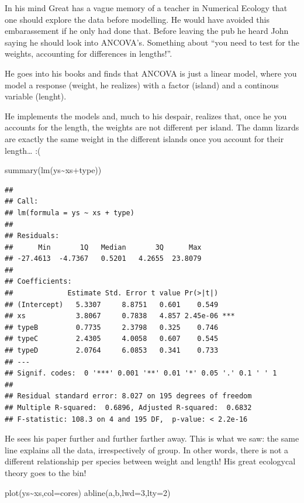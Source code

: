 \documentclass[
]{book}
\newenvironment{Shaded}{\begin{snugshade}}{\end{snugshade}}
\newcommand{\AttributeTok}[1]{\textcolor[rgb]{0.77,0.63,0.00}{#1}}
\newcommand{\DecValTok}[1]{\textcolor[rgb]{0.00,0.00,0.81}{#1}}
\newcommand{\FunctionTok}[1]{\textcolor[rgb]{0.00,0.00,0.00}{#1}}
\newcommand{\NormalTok}[1]{#1}
\newcommand{\SpecialCharTok}[1]{\textcolor[rgb]{0.00,0.00,0.00}{#1}}
\begin{document}
In his mind Great has a vague memory of a teacher in Numerical Ecology that one should explore the data before modelling. He would have avoided this embarassement if he only had done that. Before leaving the pub he heard John saying he should look into ANCOVA's. Something about ``you need to test for the weights, accounting for differences in lengths!''.

He goes into his books and finds that ANCOVA is just a linear model, where you model a response (weight, he realizes) with a factor (island) and a continous variable (lenght).

He implements the models and, much to his despair, realizes that, once he you accounts for the length, the weights are not different per island. The damn lizards are exactly the same weight in the different islands once you account for their length\ldots{} :(

\begin{Shaded}
\begin{Highlighting}[]
\FunctionTok{summary}\NormalTok{(}\FunctionTok{lm}\NormalTok{(ys}\SpecialCharTok{\textasciitilde{}}\NormalTok{xs}\SpecialCharTok{+}\NormalTok{type))}
\end{Highlighting}
\end{Shaded}

\begin{verbatim}
## 
## Call:
## lm(formula = ys ~ xs + type)
## 
## Residuals:
##      Min       1Q   Median       3Q      Max 
## -27.4613  -4.7367   0.5201   4.2655  23.8079 
## 
## Coefficients:
##             Estimate Std. Error t value Pr(>|t|)    
## (Intercept)   5.3307     8.8751   0.601    0.549    
## xs            3.8067     0.7838   4.857 2.45e-06 ***
## typeB         0.7735     2.3798   0.325    0.746    
## typeC         2.4305     4.0058   0.607    0.545    
## typeD         2.0764     6.0853   0.341    0.733    
## ---
## Signif. codes:  0 '***' 0.001 '**' 0.01 '*' 0.05 '.' 0.1 ' ' 1
## 
## Residual standard error: 8.027 on 195 degrees of freedom
## Multiple R-squared:  0.6896, Adjusted R-squared:  0.6832 
## F-statistic: 108.3 on 4 and 195 DF,  p-value: < 2.2e-16
\end{verbatim}

He sees his paper further and further farther away. This is what we saw: the same line explains all the data, irrespectively of group. In other words, there is not a different relationship per species between weight and length! His great ecologycal theory goes to the bin!

\begin{Shaded}
\begin{Highlighting}[]
\FunctionTok{plot}\NormalTok{(ys}\SpecialCharTok{\textasciitilde{}}\NormalTok{xs,}\AttributeTok{col=}\NormalTok{cores)}
\FunctionTok{abline}\NormalTok{(a,b,}\AttributeTok{lwd=}\DecValTok{3}\NormalTok{,}\AttributeTok{lty=}\DecValTok{2}\NormalTok{)}
\end{Highlighting}
\end{Shaded}
\end{document}
